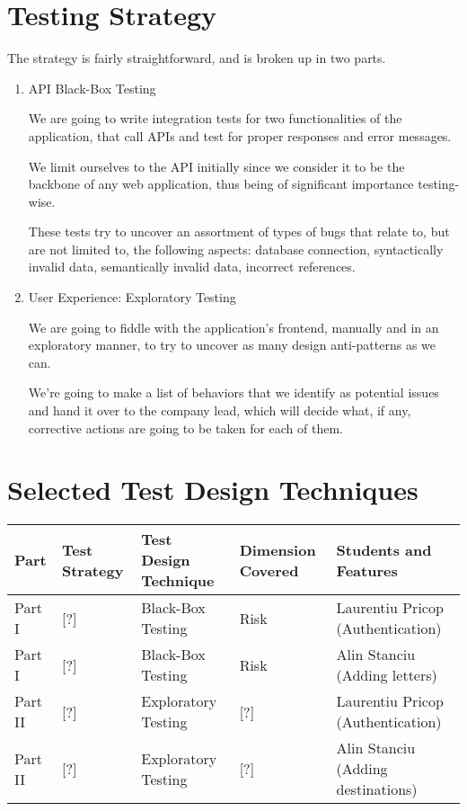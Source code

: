 \documentclass{article}
\begin{document}
\section{Testing Strategy}

The strategy is fairly straightforward, and is broken up in two parts.

\begin{enumerate}
    \item API Black-Box Testing

          We are going to write integration tests for two functionalities of the application, that call APIs and test for proper responses and error messages.

          We limit ourselves to the API initially since we consider it to be the backbone of any web application, thus being of significant importance testing-wise.

          These tests try to uncover an assortment of types of bugs that relate to, but are not limited to, the following aspects: database connection, syntactically invalid data, semantically invalid data, incorrect references.

    \item User Experience: Exploratory Testing

          We are going to fiddle with the application's frontend, manually and in an exploratory manner, to try to uncover as many design anti-patterns as we can.

          We're going to make a list of behaviors that we identify as potential issues and hand it over to the company lead, which will decide what, if any, corrective actions are going to be taken for each of them.
\end{enumerate}

\section{Selected Test Design Techniques}

\begin{tabularx}{\textwidth}{|X|X|X|X|X|}
    \hline
    Part    & Test Strategy & Test Design Technique & Dimension Covered & Students and Features              \\
    \hline
    Part I  & [?]           & Black-Box Testing     & Risk              & Laurentiu Pricop (Authentication)  \\
    \hline
    Part I  & [?]           & Black-Box Testing     & Risk              & Alin Stanciu (Adding letters)      \\
    \hline
    Part II & [?]           & Exploratory Testing   & [?]               & Laurentiu Pricop (Authentication)  \\
    \hline
    Part II & [?]           & Exploratory Testing   & [?]               & Alin Stanciu (Adding destinations) \\
    \hline
\end{tabularx}
\end{document}
